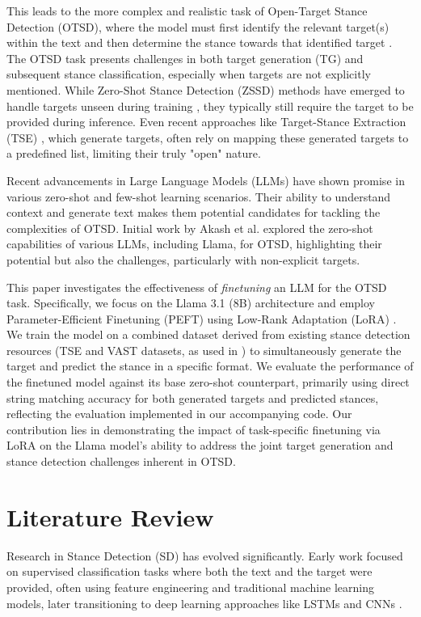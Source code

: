 \documentclass[twocolumn, 11pt,letterpaper]{article}
\begin{document}
This leads to the more complex and realistic task of Open-Target Stance Detection (OTSD), where the model must first identify the relevant target(s) within the text and then determine the stance towards that identified target \cite{akash2024}. The OTSD task presents challenges in both target generation (TG) and subsequent stance classification, especially when targets are not explicitly mentioned. While Zero-Shot Stance Detection (ZSSD) methods have emerged to handle targets unseen during training \cite{vast}, they typically still require the target to be provided during inference. Even recent approaches like Target-Stance Extraction (TSE) \cite{tse}, which generate targets, often rely on mapping these generated targets to a predefined list, limiting their truly "open" nature.

Recent advancements in Large Language Models (LLMs) have shown promise in various zero-shot and few-shot learning scenarios. Their ability to understand context and generate text makes them potential candidates for tackling the complexities of OTSD. Initial work by Akash et al. \cite{akash2024} explored the zero-shot capabilities of various LLMs, including Llama, for OTSD, highlighting their potential but also the challenges, particularly with non-explicit targets.

This paper investigates the effectiveness of \textit{finetuning} an LLM for the OTSD task. Specifically, we focus on the Llama 3.1 (8B) architecture \cite{llama3.1} and employ Parameter-Efficient Finetuning (PEFT) using Low-Rank Adaptation (LoRA) \cite{lora}. We train the model on a combined dataset derived from existing stance detection resources (TSE and VAST datasets, as used in \cite{akash2024}) to simultaneously generate the target and predict the stance in a specific format. We evaluate the performance of the finetuned model against its base zero-shot counterpart, primarily using direct string matching accuracy for both generated targets and predicted stances, reflecting the evaluation implemented in our accompanying code. Our contribution lies in demonstrating the impact of task-specific finetuning via LoRA on the Llama model's ability to address the joint target generation and stance detection challenges inherent in OTSD.

\section{Literature Review}
\label{sec:literature}

Research in Stance Detection (SD) has evolved significantly. Early work focused on supervised classification tasks where both the text and the target were provided, often using feature engineering and traditional machine learning models, later transitioning to deep learning approaches like LSTMs and CNNs \cite{vast}.
\end{document}
